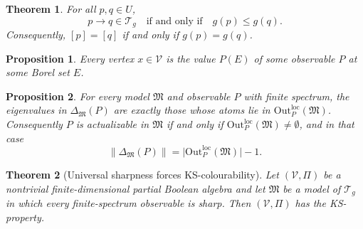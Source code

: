 \documentclass[10pt,a4paper]{amsart}
\newtheorem{theorem}{Theorem}
\newtheorem{proposition}{Proposition}
\newcommand{\Outloc}[2]{\mathrm{Out}^{\mathrm{loc}}_{#1}(#2)}
\begin{document}
\begin{theorem}
\label{thm:equiv}
For all $p,q\in U$,
\[
p\to q \in \mathcal T_g \quad \text{if and only if} \quad g(p)\le g(q).
\]
Consequently, $[p]=[q]$ if and only if $g(p)=g(q)$.
\end{theorem}

\begin{proposition}
\label{prop:vertex-as-event}
Every vertex $x\in\mathcal V$ is the value $P(E)$ of some observable $P$ at
some Borel set $E$.
\end{proposition}

\begin{proposition}
\label{prop:outcount}
For every model $\mathfrak M$ and observable $P$ with finite spectrum, the
eigenvalues in $\Delta_{\mathfrak M}(P)$ are exactly those whose atoms lie in
$\Outloc{P}{\mathfrak M}$.  Consequently $P$ is actualizable in
$\mathfrak M$ if and only if $\Outloc{P}{\mathfrak M}\ne\emptyset$, and in
that case
\[
\|\Delta_{\mathfrak M}(P)\|
 =\bigl|\Outloc{P}{\mathfrak M}\bigr|-1.
\]
\end{proposition}

\begin{theorem}[Universal sharpness forces KS-colourability]
\label{thm:sharp-implies-ks}
Let $(\mathcal V,\Pi)$ be a nontrivial finite-dimensional partial Boolean
algebra and let $\mathfrak M$ be a model of $\mathcal T_g$ in which
\emph{every} finite-spectrum observable is sharp.  Then $(\mathcal V,\Pi)$ has
the KS-property.
\end{theorem}
\end{document}
